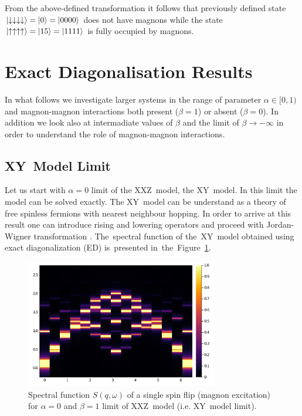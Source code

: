 \documentclass[12pt, a4paper]{article}
\begin{document}
From the above-defined transformation it follows that previously defined state $\ket{\downarrow\downarrow\downarrow\downarrow} = \ket{0} = \ket{0 0 0 0}$ does not have magnons while the state $\ket{\uparrow\uparrow\uparrow\uparrow} = \ket{15} = \ket{1 1 1 1}$ is fully occupied by magnons.

\section{Exact Diagonalisation Results}\label{sec:ed_results}
In what follows we investigate larger systems in the range of parameter $\alpha \in [0, 1)$ and magnon-magnon interactions both present ($\beta = 1$) or absent ($\beta = 0$). In addition we look also at intermadiate values of $\beta$ and the limit of $\beta \to -\infty$ in order to understand the role of magnon-magnon interactions.

\subsection{XY~Model Limit}\label{sec:XY_model}
Let us start with $\alpha = 0$ limit of the XXZ~model, the XY~model. In this limit the model can be solved exactly. The XY~model can be understand as a theory of free spinless fermions with nearest neighbour hopping. In order to arrive at this result one can introduce rising and lowering operators and proceed with Jordan-Wigner transformation \cite{JordanWigner}. The~spectral function of the~XY~model obtained using exact diagonalization (ED) is~presented in~the~Figure~\ref{fig:XY_int}.
\begin{figure}[ht]
	\centering
	\includegraphics[width=0.75\textwidth]{../figures/fig001.png}
	\caption{Spectral function $S(q,\omega)$ of a single spin flip (magnon excitation) for $\alpha = 0$ and $\beta = 1$ limit of XXZ~model (i.e. XY~model limit).}\label{fig:XY_int}
\end{figure}
\end{document}
